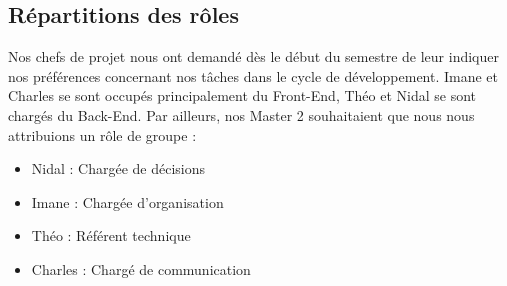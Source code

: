 \subsection{Répartitions des rôles}

Nos chefs de projet nous ont demandé dès le début du semestre de leur indiquer nos préférences concernant nos tâches dans le cycle de développement. Imane et Charles se sont occupés principalement du Front-End, Théo et Nidal se sont chargés du Back-End.
Par ailleurs, nos Master 2 souhaitaient que nous nous attribuions un rôle de groupe : 

\begin{itemize}
\item Nidal : Chargée de décisions
\item Imane : Chargée d'organisation
\item Théo : Référent technique
\item Charles : Chargé de communication
\end{itemize}

